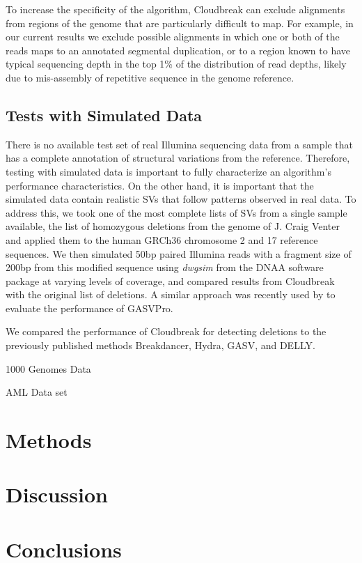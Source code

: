 \documentclass[12pt]{article}
\begin{document}
To increase the specificity of the algorithm, Cloudbreak can exclude alignments from regions of the genome that are particularly difficult to map. For example, in our current results we exclude possible alignments in which one or both of the reads maps to an annotated segmental duplication, or to a region known to have typical sequencing depth in the top 1\% of the distribution of read depths, likely due to mis-assembly of repetitive sequence in the genome reference. \cite{Pickrell:2011du}

\subsection{Tests with Simulated Data}

There is no available test set of real Illumina sequencing data from a sample that has a complete annotation of structural variations from the reference. Therefore, testing with simulated data is important to fully characterize an algorithm's performance characteristics. On the other hand, it is important that the simulated data contain realistic SVs that follow patterns observed in real data. To address this, we took one of the most complete lists of SVs from a single sample available, the list of homozygous deletions from the genome of J. Craig Venter \cite{Levy:2007fb} and applied them to the human GRCh36 chromosome 2 and 17 reference sequences. We then simulated 50bp paired Illumina reads with a fragment size of 200bp from this modified sequence using \emph{dwgsim} from the DNAA software package \cite{DNAA} at varying levels of coverage, and compared results from Cloudbreak with the original list of deletions. A similar approach was recently used by \cite{Sindi:2012kk} to evaluate the performance of GASVPro.

We compared the performance of Cloudbreak for detecting deletions to the previously published methods Breakdancer, \cite{Chen:2009p3} Hydra, \cite{Quinlan:2010gf} GASV, \cite{Sindi:2009gu} and DELLY. \cite{Rausch:2012he} 

1000 Genomes Data

AML Data set

\section{Methods}\label{methods}

\section{Discussion}\label{discussion}



\section{Conclusions}\label{conclusions}





\end{document}

